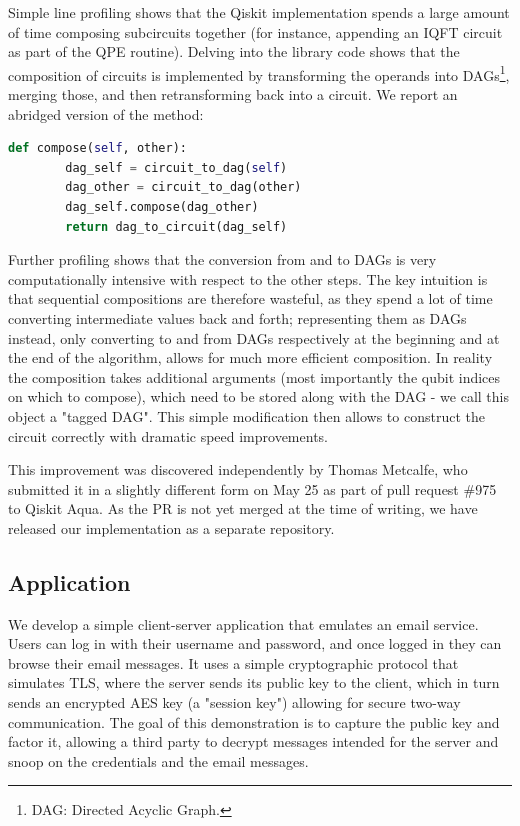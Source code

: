 \documentclass[conference]{IEEEtran}
\begin{document}
Simple line profiling shows that the Qiskit implementation spends a large amount of time composing subcircuits together (for instance, appending an IQFT circuit as part of the QPE routine). Delving into the library code shows that the composition of circuits is implemented by transforming the operands into DAGs\footnote{DAG: Directed Acyclic Graph.}, merging those, and then retransforming back into a circuit. We report an abridged version of the method:

\lstset{basicstyle=\ttfamily\footnotesize,breaklines=true}
\begin{lstlisting}[language=Python]
def compose(self, other):
        dag_self = circuit_to_dag(self)
        dag_other = circuit_to_dag(other)
        dag_self.compose(dag_other)
        return dag_to_circuit(dag_self)
\end{lstlisting}

Further profiling shows that the conversion from and to DAGs is very computationally intensive with respect to the other steps. The key intuition is that sequential compositions are therefore wasteful, as they spend a lot of time converting intermediate values back and forth; representing them as DAGs instead, only converting to and from DAGs respectively at the beginning and at the end of the algorithm, allows for much more efficient composition. In reality the composition takes additional arguments (most importantly the qubit indices on which to compose), which need to be stored along with the DAG - we call this object a "tagged DAG". This simple modification then allows to construct the circuit correctly with dramatic speed improvements.

This improvement was discovered independently by Thomas Metcalfe, who submitted it in a slightly different form on May 25 as part of pull request \#975 to Qiskit Aqua. As the PR is not yet merged at the time of writing, we have released our implementation \cite{github-repo-shor} as a separate repository.

\subsection{Application}
We develop a simple client-server application that emulates an email service. Users can log in with their username and password, and once logged in they can browse their email messages. It uses a simple cryptographic protocol that simulates TLS, where the server sends its public key to the client, which in turn sends an encrypted AES key (a "session key") allowing for secure two-way communication. The goal of this demonstration is to capture the public key and factor it, allowing a third party to decrypt messages intended for the server and snoop on the credentials and the email messages.
\end{document}
